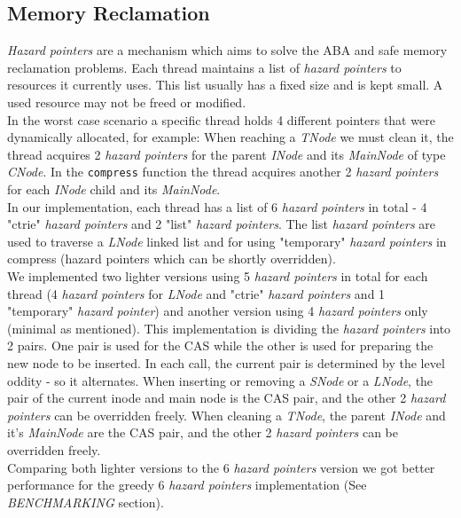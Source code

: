\documentclass[conference]{IEEEtran}
\begin{document}
\subsection{Memory Reclamation}
	\textit{Hazard pointers} are a mechanism which aims to solve the ABA and safe memory reclamation problems\cite{hazard}\cite{wiki-hazard}. Each thread maintains a list of \textit{hazard pointers} to resources it currently uses. This list usually has a fixed size and is kept small. A used resource may not be freed or modified.\\
	In the worst case scenario a specific thread holds 4 different pointers that were dynamically allocated, for example:
	When reaching a \textit{TNode} we must clean it, the thread acquires 2 \textit{hazard pointers} for the parent \textit{INode} and its \textit{MainNode} of type \textit{CNode}. In the \texttt{compress} function the thread acquires another 2 \textit{hazard pointers} for each \textit{INode} child and its \textit{MainNode}. \\
	In our implementation, each thread has a list of 6 \textit{hazard pointers} in total - 4 "ctrie" \textit{hazard pointers} and 2 "list" \textit{hazard pointers}. The list \textit{hazard pointers} are used to traverse a \textit{LNode} linked list and for using "temporary" \textit{hazard pointers} in compress (hazard pointers which can be shortly overridden). \\
	We implemented two lighter versions using 5 \textit{hazard pointers} in total\cite{5-hp-cictrie} for each thread (4 \textit{hazard pointers} for \textit{LNode} and "ctrie" \textit{hazard pointers} and 1 "temporary" \textit{hazard pointer}) and another version using 4 \textit{hazard pointers} only (minimal as mentioned)\cite{4-hp-cictrie}. This implementation is dividing the \textit{hazard pointers} into 2 pairs. One pair is used for the CAS while the other is used for preparing the new node to be inserted. In each call, the current pair is determined by the level oddity - so it alternates. When inserting or removing a \textit{SNode} or a \textit{LNode}, the pair of the current inode and main node is the CAS pair, and the other 2 \textit{hazard pointers} can be overridden freely. When cleaning a \textit{TNode}, the parent \textit{INode} and it's \textit{MainNode} are the CAS pair, and the other 2 \textit{hazard pointers} can be overridden freely. \\
	Comparing both lighter versions to the 6 \textit{hazard pointers} version we got better performance for the greedy 6 \textit{hazard pointers} implementation (See \textit{BENCHMARKING} section). \\\\
\end{document}
